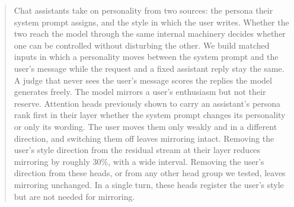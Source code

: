 \begin{abstract}
Chat assistants take on personality from two sources: the persona their system prompt assigns, and the style in which the user writes. Whether the two reach the model through the same internal machinery decides whether one can be controlled without disturbing the other.
We build matched inputs in which a personality moves between the system prompt and the user's message while the request and a fixed assistant reply stay the same. A judge that never sees the user's message scores the replies the model generates freely.
The model mirrors a user's enthusiasm but not their reserve. Attention heads previously shown to carry an assistant's persona rank first in their layer whether the system prompt changes its personality or only its wording. The user moves them only weakly and in a different direction, and switching them off leaves mirroring intact.
Removing the user's style direction from the residual stream at their layer reduces mirroring by roughly 30\%, with a wide interval. Removing the user's direction from these heads, or from any other head group we tested, leaves mirroring unchanged.
In a single turn, these heads register the user's style but are not needed for mirroring.
\end{abstract}
